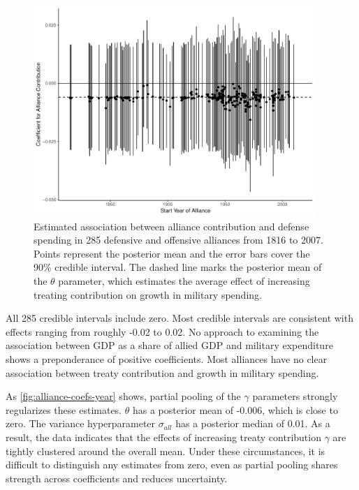 \documentclass[12pt]{article}
\begin{document}
\begin{figure}[htbp]
	\centering
		\includegraphics[width=0.95\textwidth]{alliance-coefs-year.pdf}
	\caption{Estimated association between alliance contribution and defense spending in 285 defensive and offensive alliances from 1816 to 2007. Points represent the posterior mean and the error bars cover the 90\% credible interval. The dashed line marks the posterior mean of the $\theta$ parameter, which estimates the average effect of increasing treating contribution on growth in military spending.}
	\label{fig:alliance-coefs-year}
\end{figure}


All 285 credible intervals include zero. 
Most credible intervals are consistent with effects ranging from roughly -0.02 to 0.02. 
No approach to examining the association between GDP as a share of allied GDP and military expenditure shows a preponderance of positive coefficients. 
Most alliances have no clear association between treaty contribution and growth in military spending.


As \autoref{fig:alliance-coefs-year} shows, partial pooling of the $\gamma$ parameters strongly regularizes these estimates. 
$\theta$ has a posterior mean of -0.006, which is close to zero. 
The variance hyperparameter $\sigma_{all}$ has a posterior median of 0.01. 
As a result, the data indicates that the effects of increasing treaty contribution $\gamma$ are tightly clustered around the overall mean. 
Under these circumstances, it is difficult to distinguish any estimates from zero, even as partial pooling shares strength across coefficients and reduces uncertainty. 
\end{document}
